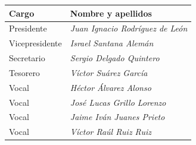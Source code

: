 \documentclass[a4paper, 12pt, oneside]{book}
\begin{document}
\begin{table}[H]
    \begin{tabular}{l|l}
        {\bf Cargo} & {\bf Nombre y apellidos}\\
        \hline
        Presidente & \textit{Juan Ignacio Rodríguez de León}\\
        Vicepresidente & \textit{Israel Santana Alemán}\\
        Secretario & \textit{Sergio Delgado Quintero}\\
        Tesorero & \textit{Víctor Suárez García}\\
        \hline
        Vocal & \textit{Héctor Álvarez Alonso}\\
        Vocal & \textit{José Lucas Grillo Lorenzo}\\
        Vocal & \textit{Jaime Iván Juanes Prieto}\\
        Vocal & \textit{Víctor Raúl Ruiz Ruiz}\\
        \hline
    \end{tabular}
\end{table}
\end{document}
